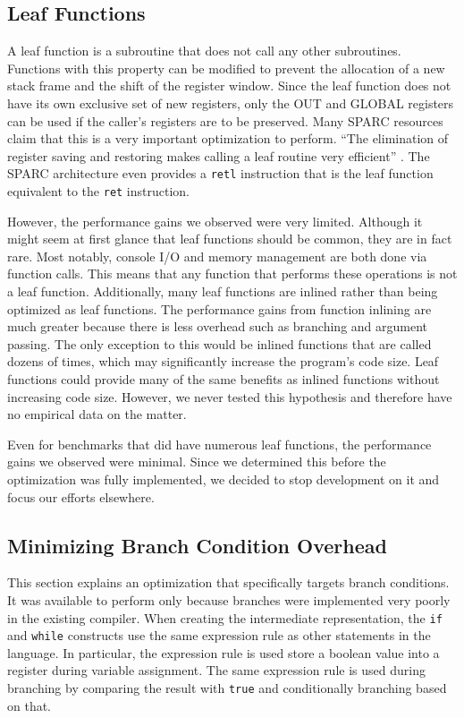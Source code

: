\documentclass[12pt]{article}
\begin{document}
\subsection{Leaf Functions}
A leaf function is a subroutine that does not call any other subroutines.
Functions with this property can be modified to prevent the allocation of a new stack frame and the shift of the register window.
Since the leaf function does not have its own exclusive set of new registers, only the OUT and GLOBAL registers can be used if the caller's registers are to be preserved.
Many SPARC resources claim that this is a very important optimization to perform.
``The elimination of register saving and restoring makes calling a leaf routine very efficient'' \cite{sparcArchitecture}.
The SPARC architecture even provides a {\tt retl} instruction that is the leaf function equivalent to the {\tt ret} instruction.

However, the performance gains we observed were very limited.
Although it might seem at first glance that leaf functions should be common, they are in fact rare.
Most notably, console I/O and memory management are both done via function calls.
This means that any function that performs these operations is not a leaf function.
Additionally, many leaf functions are inlined rather than being optimized as leaf functions.
The performance gains from function inlining are much greater because there is less overhead such as branching and argument passing.
The only exception to this would be inlined functions that are called dozens of times, which may significantly increase the program's code size.
Leaf functions could provide many of the same benefits as inlined functions without increasing code size.
However, we never tested this hypothesis and therefore have no empirical data on the matter.

Even for benchmarks that did have numerous leaf functions, the performance gains we observed were minimal.
Since we determined this before the optimization was fully implemented, we decided to stop development on it and focus our efforts elsewhere.

\subsection{Minimizing Branch Condition Overhead}
This section explains an optimization that specifically targets branch conditions.
It was available to perform only because branches were implemented very poorly in the existing compiler.
When creating the intermediate representation, the {\tt if} and {\tt while} constructs use the same expression rule as other statements in the language.
In particular, the expression rule is used store a boolean value into a register during variable assignment.
The same expression rule is used during branching by comparing the result with {\tt true} and conditionally branching based on that.
\end{document}
